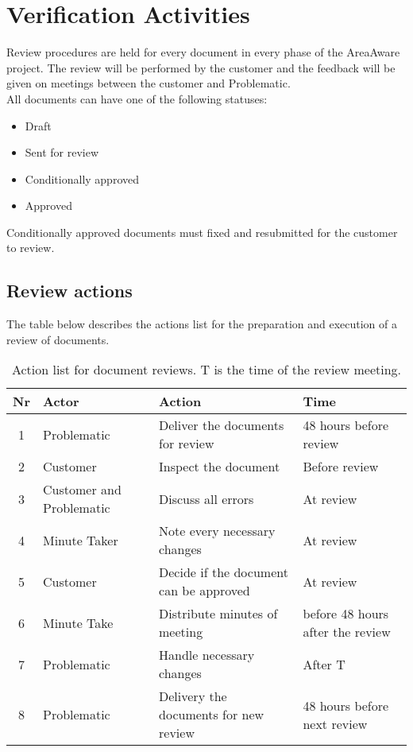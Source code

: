 \chapter{Verification Activities}
\label{chp:verificationActivities}

Review procedures are held for every document in every phase of the AreaAware project. 
The review will be performed by the customer and the feedback will be given on meetings between the customer and Problematic. \\
All documents can have one of the following statuses:
\begin{itemize}
    \item Draft
    \item Sent for review
    \item Conditionally approved
    \item Approved
\end{itemize}
Conditionally approved documents must fixed and resubmitted for the customer to review.

\section{Review actions}
The table below describes the actions list for the preparation and execution of a review of documents.
\begin{table}[ht]
    \centering
    \begin{tabular}{|c|l|p{5cm}|l|}
        \hline 
        \textbf{Nr} & \textbf{Actor} & \textbf{Action} & \textbf{Time} \\ 
        \hline
        1 & Problematic & Deliver the documents for review & 48 hours before review \\ 
        \hline  
        2 & Customer & Inspect the document & Before review \\ 
        \hline  
        3 & Customer and Problematic & Discuss all errors & At review \\
        \hline
        4 & Minute Taker & Note every necessary changes & At review \\
        \hline
        5 & Customer & Decide if the document can be approved & At review \\
        \hline
        6 & Minute Take & Distribute minutes of meeting & before 48 hours after the review \\
        \hline
        7 & Problematic & Handle necessary changes & After T \\
        \hline
        8 & Problematic & Delivery the documents for new review & 48 hours before next review \\ 
        \hline  
    \end{tabular}
    \caption{Action list for document reviews. T is the time of the review meeting.}
\end{table}